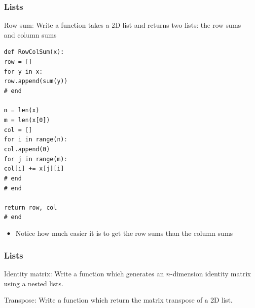 \documentclass{beamer}
\newcommand{\code}[1]{\texttt{#1}}
\newcommand{\tab}{\hspace*{22pt}}
\begin{document}
\begin{frame}
	\frametitle{Lists}
	
	\begin{block}{Row sum:}
		Write a function takes a 2D list and returns two lists: the row sums and column sums
		
		\vspace{10pt}
			\begin{footnotesize}
			\code{def RowColSum(x): \\[-5pt]
					\tab row = [] \\[-5pt]
					\tab for y in x: \\[-5pt]
					\tab \tab row.append(sum(y)) \\[-5pt]
					\tab \# end \\[-5pt]
					\tab \\[-5pt]
					\tab n = len(x) \\[-5pt]
					\tab m = len(x[0]) \\[-5pt]
					\tab col = [] \\[-5pt]
					\tab for i in range(n): \\[-5pt]
					\tab \tab col.append(0) \\[-5pt]
					\tab \tab for j in range(m): \\[-5pt]
					\tab \tab \tab col[i] += x[j][i] \\[-5pt]
					\tab \tab \# end \\[-5pt]
				\tab \# end \\[-5pt]
					\tab \\[-5pt]
				\tab return row, col \\[-5pt]
			\# end
			}
			\end{footnotesize}
		\endminipage\hfill
			\begin{itemize}
				\item Notice how much easier it is to get the row sums than the column sums
			\end{itemize}
		\endminipage\hfill
	\end{block}
	
\end{frame}

\begin{frame}%
	\frametitle{Lists}
	
	\begin{exampleblock}{Identity matrix:}
		Write a function which generates an $n$-dimension identity matrix using a nested lists.
	\end{exampleblock}
	
	\begin{exampleblock}{Transpose:}
		Write a function which return the matrix transpose of a 2D list.
	\end{exampleblock}
	
\end{frame}
\end{document}
